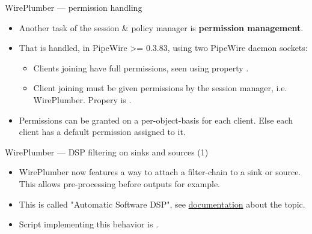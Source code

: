 \begin{frame}{WirePlumber — permission handling}
  \begin{itemize}

  \item Another task of the session \& policy manager is \textbf{permission
    management}.

  \item That is handled, in PipeWire >= 0.3.83, using two PipeWire daemon sockets:

    \begin{itemize}
    \item Clients joining  have full permissions, seen
      using property .
    \item Client joining  must be given permissions by the
      session manager, i.e. WirePlumber. Propery  is
      .
    \end{itemize}

  \item Permissions can be granted on a per-object-basis for each client. Else
    each client has a default permission assigned to it.

  \end{itemize}
\end{frame}



\begin{frame}{WirePlumber — DSP filtering on sinks and sources (1)}
  \begin{itemize}

  \item WirePlumber now features a way to attach a filter-chain to a sink or
    source. This allows pre-processing before outputs for example.

  \item This is called "Automatic Software DSP", see
    \href{https://pipewire.pages.freedesktop.org/wireplumber/policies/software_dsp.html}{
    documentation} about the topic.

  \item Script implementing this behavior is .

  \end{itemize}
\end{frame}



